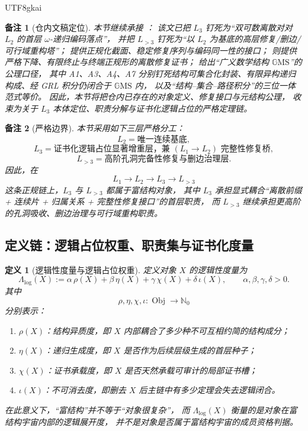 \documentclass[12pt]{article}
\newtheorem{definition}{定义}[section]
\newtheorem{remark}{备注}[section]
\newcommand{\GMS}{\mathbb{G}\mathrm{MS}}
\begin{document}
\begin{CJK*}{UTF8}{gkai}
\begin{remark}[仓内文稿定位]
本节继续承接 \cite{RepoTex41HomotopyRepairBundle}：
该文已把 \(L_3\) 钉死为“双可数离散对对 \(L_2\) 的首层 \(\omega\)-递归编码落点”，
并把 \(L_{>3}\) 钉死为“以 \(L_2\) 为基底的高层修复/删边/可行域重构塔”；
\cite{RepoTex36HomotopyTwistEquivalence} 提供正规化截面、稳定修复序列与编码同一性的接口；
\cite{RepoTex38JacobiBianchiRepair} 则提供严格下降、有限终止与终端正规形的离散修复证书；
\cite{RepoMetaGMSAxiom} 给出“广义数学结构 \(\GMS\)”的公理口径，
其中 A1、A3、A4、A7 分别钉死结构可集合化封装、有限异构递归构成、经 GRL 积分仍闭合于 \(\GMS\) 内，
以及“结构--集合--路径积分”的三位一体范式等价。
因此，本节将把仓内已存在的对象定义、修复接口与元结构公理，
收束为关于 \(L_3\) 本体定位、职责分解与证书化逻辑占位的严格定理链。
\end{remark}

\begin{remark}[严格边界]
本节采用如下三层严格分工：
\[
  L_2=\text{唯一连续基底},
\]
\[
  L_3=\text{证书化逻辑占位显著增重层，兼 }(L_1\to L_2)\text{ 完整性修复桥},
\]
\[
  L_{>3}=\text{高阶孔洞完备性修复与删边治理层}.
\]
因此，在
\[
  L_1\to L_2\to L_3\to L_{>3}
\]
这条正规链上，\(L_3\) 与 \(L_{>3}\) 都属于富结构对象，
其中 \(L_3\) 承担显式耦合“离散前缀 + 连续片 + 归属关系 + 完整性修复接口”的首层职责，
而 \(L_{>3}\) 继续承担更高阶的孔洞吸收、删边治理与可行域重构职责。
\end{remark}

\subsection{定义链：逻辑占位权重、职责集与证书化度量}
\label{subsec:tex1-ch12-defs}

\begin{definition}[逻辑性度量与逻辑占位权重]
\label{def:tex1-ch12-logicality}
定义对象 \(X\) 的逻辑性度量为
\[
  \Lambda_{\mathrm{log}}(X)
  :=
  \alpha\,\rho(X)
  +
  \beta\,\eta(X)
  +
  \gamma\,\chi(X)
  +
  \delta\,\iota(X),
  \qquad
  \alpha,\beta,\gamma,\delta>0.
\]
其中
\[
  \rho,\eta,\chi,\iota:\operatorname{Obj}\to \mathbb{N}_0
\]
分别表示：
\begin{enumerate}
  \item \(\rho(X)\)：结构异质度，即 \(X\) 内部耦合了多少种不可互相约简的结构成分；
  \item \(\eta(X)\)：递归生成度，即 \(X\) 是否作为后续层级生成的首层种子；
  \item \(\chi(X)\)：证书承载度，即 \(X\) 是否天然承载可审计的局部证书槽；
  \item \(\iota(X)\)：不可消去度，即删去 \(X\) 后主链中有多少定理会失去逻辑闭合。
\end{enumerate}
在此意义下，“富结构”并不等于“对象很复杂”，
而 \(\Lambda_{\mathrm{log}}(X)\) 衡量的是对象在富结构宇宙内部的逻辑展开度，
并不是对象是否属于富结构宇宙的成员资格判据。
\end{definition}


\end{CJK*}
\end{document}
